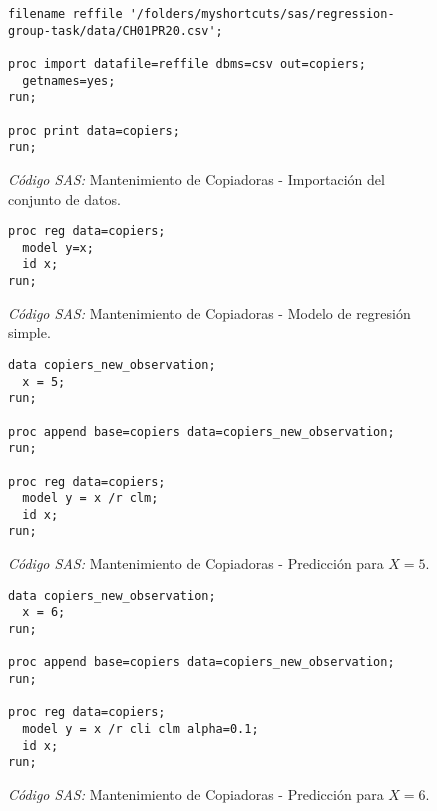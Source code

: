 \documentclass{article}
\begin{document}
    \begin{figure}[!h]
      \centering
      \begin{verbatim}
filename reffile '/folders/myshortcuts/sas/regression-group-task/data/CH01PR20.csv';

proc import datafile=reffile dbms=csv out=copiers;
  getnames=yes;
run;

proc print data=copiers;
run;
      \end{verbatim}
      \caption{\emph{Código SAS:} Mantenimiento de Copiadoras - Importación del conjunto de datos.}
      \label{code:sas-copiers-1}
    \end{figure}


    \begin{figure}[!h]
      \centering
      \begin{verbatim}
proc reg data=copiers;
  model y=x;
  id x;
run;
      \end{verbatim}
      \caption{\emph{Código SAS:} Mantenimiento de Copiadoras - Modelo de regresión simple.}
      \label{code:sas-copiers-2}
    \end{figure}

    \begin{figure}[!h]
      \centering
      \begin{verbatim}
data copiers_new_observation;
  x = 5;
run;

proc append base=copiers data=copiers_new_observation;
run;

proc reg data=copiers;
  model y = x /r clm;
  id x;
run;
      \end{verbatim}
      \caption{\emph{Código SAS:} Mantenimiento de Copiadoras - Predicción para $X = 5$.}
      \label{code:sas-copiers-3}
    \end{figure}

    \begin{figure}[!h]
      \centering
      \begin{verbatim}
data copiers_new_observation;
  x = 6;
run;

proc append base=copiers data=copiers_new_observation;
run;

proc reg data=copiers;
  model y = x /r cli clm alpha=0.1;
  id x;
run;
      \end{verbatim}
      \caption{\emph{Código SAS:} Mantenimiento de Copiadoras - Predicción para $X = 6$.}
      \label{code:sas-copiers-4}
    \end{figure}


  \nocite{rano2017}
  \nocite{sas}
  \nocite{neter1996applied}
  \nocite{montgomery2012introduction}

  
  
\end{document}
